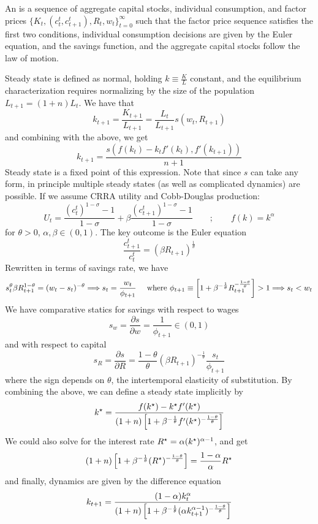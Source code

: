 \documentclass[10pt]{article}
\begin{document}
\begin{definition}
	An  is a sequence of aggregate capital stocks, individual consumption, and factor prices $\{K_t,(c_t^t,c_{t+1}^t),R_t,w_t\}_{t=0}^\infty$ such that the factor price sequence satisfies the first two conditions, individual consumption decisions are given by the Euler equation, and the savings function, and the aggregate capital stocks follow the law of motion. 
\end{definition}

Steady state is defined as normal, holding $k \equiv \frac{K}{L}$ constant, and the equilibrium characterization requires normalizing by the size of the population $L_{t+1} = (1+n)L_t$. We have that \[k_{t+1} = \frac{K_{t+1}}{L_{t+1}} = \frac{L_t}{L_{t+1}}s(w_t,R_{t+1})\]and combining with the above, we get \[k_{t+1} = \frac{s(f(k_t) - k_tf'(k_t),f'(k_{t+1}))}{n+1}\]Steady state is a fixed point of this expression. Note that since $s$ can take any form, in principle multiple steady states (as well as complicated dynamics) are possible. If we assume CRRA utility and Cobb-Douglas production: \[U_t = \frac{(c_t^t)^{1-\sigma}-1}{1-\sigma} + \beta \frac{(c_{t+1}^t)^{1-\sigma}-1}{1-\sigma}  \qquad ; \qquad f(k) = k^\alpha\] for $\theta > 0$, $\alpha,\beta \in (0,1)$. The key outcome is the Euler equation \[\frac{c_{t+1}^t}{c_t^t} = (\beta R_{t+1})^\frac{1}{\theta}\]Rewritten in terms of savings rate, we have \[s_t^\theta \beta R_{t+1}^{1-\theta} = (w_t - s_t)^{-\theta} \Longrightarrow s_t = \frac{w_t}{\phi_{t+1}} \quad \text{ where } \phi_{t+1} \equiv \left[ 1 + \beta^{-\frac{1}{\theta}}R_{t+1}^{-\frac{1-\theta}{\theta}}\right] > 1 \Longrightarrow s_t < w_t\]We have comparative statics for savings with respect to wages \[s_w = \frac{\partial s}{\partial w} = \frac{1}{\phi_{t+1}} \in (0,1)\]and with respect to capital \[s_R = \frac{\partial s}{\partial R} = \frac{1-\theta}{\theta} (\beta R_{t+1})^{-\frac{1}{\theta}} \frac{s_t}{\phi_{t+1}}\]where the sign depends on $\theta$, the intertemporal elasticity of substitution. By combining the above, we can define a steady state implicitly by \[k^\star = \frac{f(k^\star) - k^\star f'(k^\star)}{(1+n)\left[ 1 + \beta^{-\frac{1}{\theta}}f'(k^\star)^{-\frac{1-\theta}{\theta}}\right]}\]We could also solve for the interest rate $R^\star = \alpha (k^\star)^{\alpha-1}$, and get\[(1+n)\left[ 1 + \beta^{-\frac{1}{\theta}}(R^\star)^{-\frac{1-\theta}{\theta}}\right] = \frac{1-\alpha}{\alpha} R^\star\]and finally, dynamics are given by the difference equation \[k_{t+1} = \frac{(1-\alpha)k_t^\alpha}{(1+n)\left[ 1 + \beta^{-\frac{1}{\theta}}(\alpha k_{t+1}^{\alpha-1})^{-\frac{1-\theta}{\theta}}\right]}\]
\end{document}
